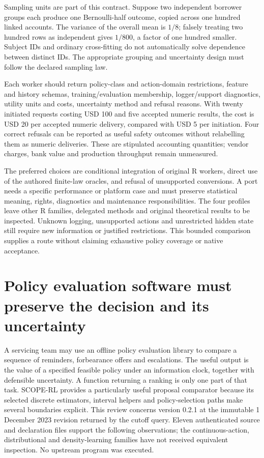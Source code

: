 Sampling units are part of this contract. Suppose two independent borrower groups
each produce one Bernoulli-half outcome, copied across one hundred linked accounts.
The variance of the overall mean is $1/8$; falsely treating two hundred rows as
independent gives $1/800$, a factor of one hundred smaller. Subject IDs and ordinary
cross-fitting do not automatically solve dependence between distinct IDs. The
appropriate grouping and uncertainty design must follow the declared sampling law.
\citep{exec24_policiesr_reference}

Each worker should return policy-class and action-domain restrictions, feature and
history schemas, training/evaluation membership, logger/support diagnostics, utility
units and costs, uncertainty method and refusal reasons. With twenty initiated
requests costing USD 100 and five accepted numeric results, the cost is USD 20 per
accepted numeric delivery, compared with USD 5 per initiation. Four correct refusals
can be reported as useful safety outcomes without relabelling them as numeric
deliveries. These are stipulated accounting quantities; vendor charges, bank value
and production throughput remain unmeasured.~\citep{exec24_policiesr_reference}

The preferred choices are conditional integration of original R workers, direct use
of the authored finite-law oracles, and refusal of unsupported conversions. A port
needs a specific performance or platform case and must preserve statistical meaning,
rights, diagnostics and maintenance responsibilities. The four profiles leave other
R families, delegated methods and original theoretical results to be inspected.
Unknown logging, unsupported actions and unrestricted hidden state still require
new information or justified restrictions. This bounded comparison supplies a route
without claiming exhaustive policy coverage or native acceptance.


\section{Policy evaluation software must preserve the decision and its uncertainty}
\label{exec23:scope-rl-scope}
A servicing team may use an offline policy evaluation library to compare a
sequence of reminders, forbearance offers and escalations. The useful output is
the value of a specified feasible policy under an information clock, together
with defensible uncertainty. A function returning a ranking is only one part of
that task. SCOPE-RL provides a particularly useful proposal comparator because
its selected discrete estimators, interval helpers and policy-selection paths
make several boundaries explicit. This review concerns version 0.2.1 at the
immutable 1 December 2023 revision returned by the cutoff query. Eleven
authenticated source and declaration files support the following observations;
the continuous-action, distributional and density-learning families have not
received equivalent inspection. No upstream program was executed.
\cite{exec23_scope_rl_sources}

